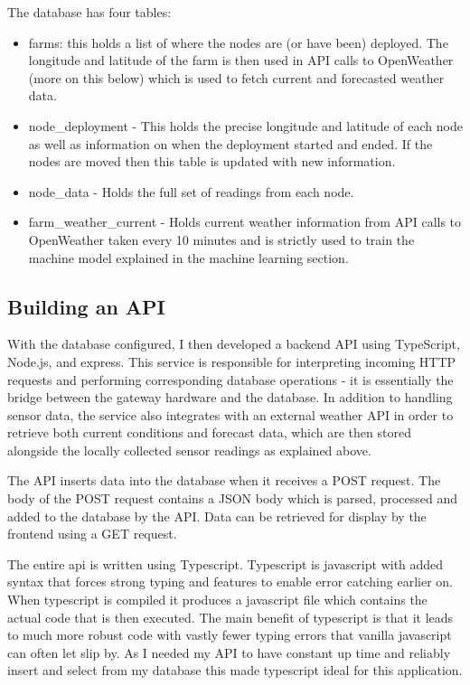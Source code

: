 The database has four tables:

\begin{itemize}     
      \item farms: this holds a list of where the nodes are (or have been)
      deployed. The longitude and latitude of the farm is then used in API calls
      to OpenWeather (more on this below) which is used to fetch current and
      forecasted weather data.
      \item node\_deployment - This holds the precise longitude and latitude of
      each node as well as information on when the deployment started and ended.
      If the nodes are moved then this table is updated with new information.     
      \item node\_data - Holds the full set of readings from each node.    
      \item farm\_weather\_current - Holds current weather information from API
      calls to OpenWeather taken every 10 minutes and is strictly used to train
      the machine model explained in the machine learning section.
 \end{itemize} 


\subsection{Building an API}

With the database configured, I then developed a backend API using TypeScript,
Node.js, and express. This service is responsible for interpreting incoming HTTP
requests and performing corresponding database operations - it is essentially
the bridge between the gateway hardware and the database. In addition to
handling sensor data, the service also integrates with an external weather API
in order to retrieve both current conditions and forecast data, which are then
stored alongside the locally collected sensor readings as explained above.

The API inserts data into the database when it receives a POST request. The body
of the POST request contains a JSON body which is parsed, processed and added to
the database by the API. Data can be retrieved for display by the frontend using
a GET request.

The entire api is written using Typescript. Typescript is javascript with added
syntax that forces strong typing and features to enable error catching earlier
on. When typescript is compiled it produces a javascript file which contains the
actual code that is then executed. The main benefit of typescript is that it
leads to much more robust code with vastly fewer typing errors that vanilla
javascript can often let slip by. As I needed my API to have constant up time
and reliably insert and select from my database this made typescript ideal for
this application.

